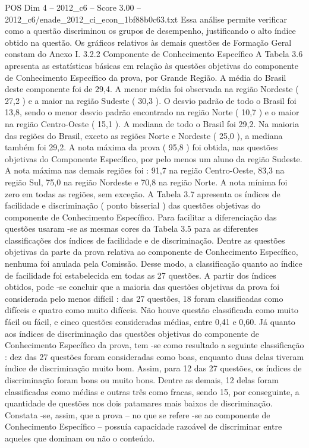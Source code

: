 \begin{textsample}{POS Dim 4 – 2012\_c6 – Score 3.00 – 2012\_c6/enade\_2012\_ci\_econ\_1bf88b0c63.txt}
Essa análise permite verificar como a questão discriminou os grupos de desempenho, justificando o alto índice obtido na questão.
Os gráficos relativos às demais questões de Formação Geral constam do Anexo I. 3.2.2 Componente de Conhecimento Específico A Tabela 3.6 apresenta as estatísticas básicas em relação às questões objetivas do componente de Conhecimento Específico da prova, por Grande Região.
A média do Brasil deste componente foi de 29,4.
A menor média foi observada na região Nordeste ( 27,2 ) e a maior na região Sudeste ( 30,3 ).
O desvio padrão de todo o Brasil foi 13,8, sendo o menor desvio padrão encontrado na região Norte ( 10,7 ) e o maior na região Centro-Oeste ( 15,1 ).
A mediana de todo o Brasil foi 29,2.
Na maioria das regiões do Brasil, exceto as regiões Norte e Nordeste ( 25,0 ), a mediana também foi 29,2.
A nota máxima da prova ( 95,8 ) foi obtida, nas questões objetivas do Componente Específico, por pelo menos um aluno da região Sudeste.
A nota máxima nas demais regiões foi : 91,7 na região Centro-Oeste, 83,3 na região Sul, 75,0 na região Nordeste e 70,8 na região Norte.
A nota mínima foi zero em todas as regiões, sem exceção.
A Tabela 3.7 apresenta os índices de facilidade e discriminação ( ponto bisserial ) das questões objetivas do componente de Conhecimento Específico.
Para facilitar a diferenciação das questões usaram -se as mesmas cores da Tabela 3.5 para as diferentes classificações dos índices de facilidade e de discriminação.
Dentre as questões objetivas da parte da prova relativa ao componente de Conhecimento Específico, nenhuma foi anulada pela Comissão.
Desse modo, a classificação quanto ao índice de facilidade foi estabelecida em todas as 27 questões.
A partir dos índices obtidos, pode -se concluir que a maioria das questões objetivas da prova foi considerada pelo menos difícil : das 27 questões, 18 foram classificadas como difíceis e quatro como muito difíceis.
Não houve questão classificada como muito fácil ou fácil, e cinco questões consideradas médias, entre 0,41 e 0,60.
Já quanto aos índices de discriminação das questões objetivas do componente de Conhecimento Específico da prova, tem -se como resultado a seguinte classificação : dez das 27 questões foram consideradas como boas, enquanto duas delas tiveram índice de discriminação muito bom.
Assim, para 12 das 27 questões, os índices de discriminação foram bons ou muito bons.
Dentre as demais, 12 delas foram classificadas como médias e outras três como fracas, sendo 15, por conseguinte, a quantidade de questões nos dois patamares mais baixos de discriminação.
Constata -se, assim, que a prova – no que se refere -se ao componente de Conhecimento Específico – possuía capacidade razoável de discriminar entre aqueles que dominam ou não o conteúdo.

\end{textsample}
